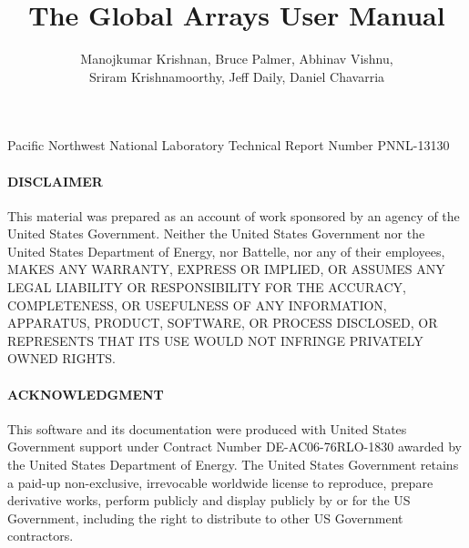 \documentclass[oneside,english]{book}
\begin{document}
\title{The Global Arrays User Manual}

\author{Manojkumar Krishnan, Bruce Palmer, Abhinav Vishnu, \\
Sriram Krishnamoorthy, Jeff Daily, Daniel Chavarria}

\maketitle

\begin{center}
Pacific Northwest National Laboratory Technical Report Number PNNL-13130
\par\end{center}

\paragraph{DISCLAIMER}

This material was prepared as an account of work sponsored by an agency of the United States Government. Neither the United States Government nor the United States Department of Energy, nor Battelle, nor any of their employees, MAKES ANY WARRANTY, EXPRESS OR IMPLIED, OR ASSUMES ANY LEGAL LIABILITY OR RESPONSIBILITY FOR THE ACCURACY, COMPLETENESS, OR USEFULNESS OF ANY INFORMATION, APPARATUS, PRODUCT, SOFTWARE, OR PROCESS DISCLOSED, OR REPRESENTS THAT ITS USE WOULD NOT INFRINGE PRIVATELY OWNED RIGHTS.

\paragraph{ACKNOWLEDGMENT}

This software and its documentation were produced with United States Government support under Contract Number DE-AC06-76RLO-1830 awarded by the United States Department of Energy. The United States Government retains a paid-up non-exclusive, irrevocable worldwide license to reproduce, prepare derivative works, perform publicly and display publicly by or for the US Government, including the right to distribute to other US Government contractors. 

\tableofcontents{}



% 




















\end{document}
